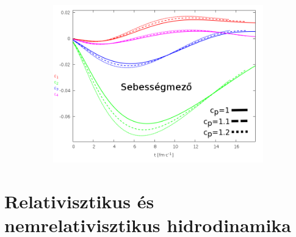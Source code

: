 \documentclass{beamer}
\begin{document}
\begin{frame}
\begin{center}
\begin{figure}[H]
\begin{subfigure}[b]{0.49\textwidth}
        	\includegraphics[width=\textwidth]{pic/res/rel/eps_pc_v}
	\end{subfigure}
\end{figure}
\end{center}
\end{frame}

\section{Relativisztikus és nemrelativisztikus hidrodinamika}
\end{document}

